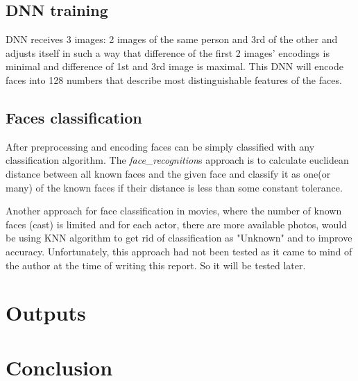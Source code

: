 \documentclass[hidelinks, english]{mvi-report}
\begin{document}
\subsection{DNN training}
DNN receives 3 images: 2 images of the same person and 3rd of the other and adjusts itself in such a way that
difference of the first 2 images' encodings is minimal and difference of 1st and 3rd image is maximal. This DNN will
encode faces into 128 numbers that describe most distinguishable features of the faces.

\subsection{Faces classification}
After preprocessing and encoding faces can be simply classified with any classification algorithm.
The \textit{face\_recognition}s approach is to calculate euclidean distance between all known faces and the given
face and classify it as one(or many) of the known faces if their distance is less than some constant tolerance.

Another approach for face classification in movies, where the number of known faces (cast) is limited and for each
actor, there are more available photos, would be using KNN algorithm to get rid of classification as "Unknown" and to
improve accuracy. Unfortunately, this approach had not been tested as it came to mind of the author at the time of
writing this report. So it will be tested later.

\section{Outputs}



\section{Conclusion}





\end{document}

